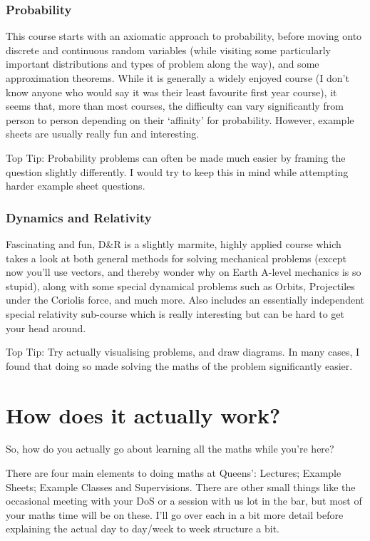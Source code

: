 \documentclass[a4paper,11pt]{article}
\begin{document}
\subsubsection{Probability}

This course starts with an axiomatic approach to probability, before moving onto discrete and continuous random variables (while visiting some particularly important distributions and types of problem along the way), and some approximation theorems. While it is generally a widely enjoyed course (I don't know anyone who would say it was their least favourite first year course), it seems that, more than most courses, the difficulty can vary significantly from person to person depending on their `affinity' for probability. However, example sheets are usually really fun and interesting.

Top Tip: Probability problems can often be made much easier by framing the question slightly differently. I would try to keep this in mind while attempting harder example sheet questions.

\subsubsection{Dynamics and Relativity}

Fascinating and fun, D\&R is a slightly marmite, highly applied course which takes a look at both general methods for solving mechanical problems (except now you'll use vectors, and thereby wonder why on Earth A-level mechanics is so stupid), along with some special dynamical problems such as Orbits, Projectiles under the Coriolis force, and much more. Also includes an essentially independent special relativity sub-course which is really interesting but can be hard to get your head around. 

Top Tip: Try actually visualising problems, and draw diagrams. In many cases, I found that doing so made solving the maths of the problem significantly easier.

\section{How does it actually work?}

So, how do you actually go about learning all the maths while you're here? 

There are four main elements to doing maths at Queens': Lectures; Example Sheets; Example Classes and Supervisions. There are other small things like the occasional meeting with your DoS or a session with us lot in the bar, but most of your maths time will be on these. I'll go over each in a bit more detail before explaining the actual day to day/week to week structure a bit.  
\end{document}
